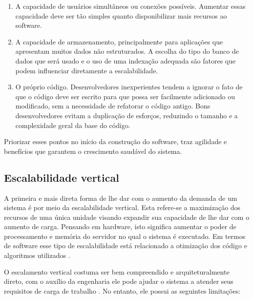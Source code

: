   \begin{enumerate}
    \item A capacidade de usuários simultâneos ou conexões possíveis.
    Aumentar essas capacidade deve ser tão simples quanto disponibilizar mais
    recursos ao software.
    \item A capacidade de armazenamento, principalmente para aplicações
    que apresentam muitos dados não estruturados. A escolha do tipo do banco de
    dados que será usado e o uso de uma indexação adequada são fatores que
    podem influenciar diretamente a escalabilidade.
    \item O próprio código. Desenvolvedores inexperientes tendem a ignorar
    o fato de que o código deve ser escrito para que possa ser facilmente
    adicionado ou modificado, sem a necessidade de refatorar o código antigo.
    Bons desenvolvedores evitam a duplicação de esforços, reduzindo o tamanho
    e a complexidade geral da base do código.
  \end{enumerate}

Priorizar esses pontos no início da construção do software, traz agilidade e
benefícios que garantem o crescimento saudável do sistema.

\subsection{Escalabilidade vertical}

A primeira e mais direta forma de lhe dar com o aumento da demanda de um
sistema é por meio da escalabilidade vertical. Esta refere-se a maximização
dos recursos de uma única unidade visando expandir sua capacidade de lhe dar
com o aumento de carga.  Pensando em hardware, isto significa aumentar o poder
de processamento e memória do servidor no qual o sistema é executado. Em termos
de software esse tipo de escalabilidade está relacionado a otimização dos código
e algoritmos utilizados \cite{FreshGuide2012}.

O escalamento vertical costuma ser bem compreendido e arquiteturalmente direto,
com o auxílio da engenharia ele pode ajudar o sistema a atender seus requisitos
de carga de trabalho \cite{InterSystems2019}. No entanto, ele possui as seguintes
limitações:

